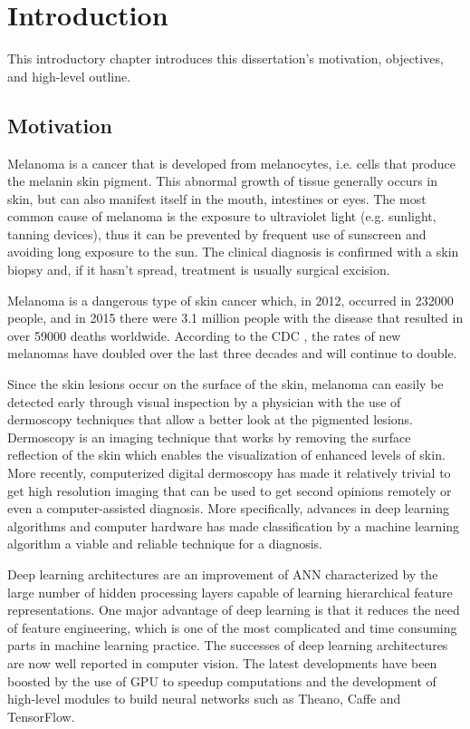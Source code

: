 \chapter{Introduction}
\label{chapter:introduction}

This introductory chapter introduces this dissertation's motivation, objectives, and high-level outline.

\section{Motivation}

Melanoma is a cancer that is developed from melanocytes, i.e. cells that produce the melanin skin pigment. This abnormal growth of tissue generally occurs in skin, but can also manifest itself in the mouth, intestines or eyes. The most common cause of melanoma is the exposure to ultraviolet light (e.g. sunlight, tanning devices), thus it can be prevented by frequent use of sunscreen and avoiding long exposure to the sun. The clinical diagnosis is confirmed with a skin biopsy and, if it hasn't spread, treatment is usually surgical excision.

Melanoma is a dangerous type of skin cancer which, in 2012, occurred in 232000 people, and in 2015 there were 3.1 million people with the disease that resulted in over 59000 deaths worldwide. According to the \ac{CDC} , the rates of new melanomas have doubled over the last three decades and will continue to double.

Since the skin lesions occur on the surface of the skin, melanoma can easily be detected early through visual inspection by a physician with the use of dermoscopy techniques that allow a better look at the pigmented lesions. Dermoscopy is an imaging technique that works by removing the surface reflection of the skin which enables the visualization of enhanced levels of skin. More recently, computerized digital dermoscopy has made it relatively trivial to get high resolution imaging that can be used to get second opinions remotely or even a computer-assisted diagnosis\cite{dermoscopy}. More specifically, advances in deep learning algorithms and computer hardware has made classification by a machine learning algorithm a viable and reliable technique for a diagnosis.

Deep learning architectures are an improvement of \ac{ANN} characterized by the large number of hidden processing layers capable of learning hierarchical feature representations. One major advantage of deep learning is that it reduces the need of feature engineering, which is one of the most complicated and time consuming parts in machine learning practice. The successes of deep learning architectures are now well reported in computer vision. The latest developments have been boosted by the use of \ac{GPU} to speedup computations and the development of high-level modules to build neural networks such as Theano, Caffe and TensorFlow.

